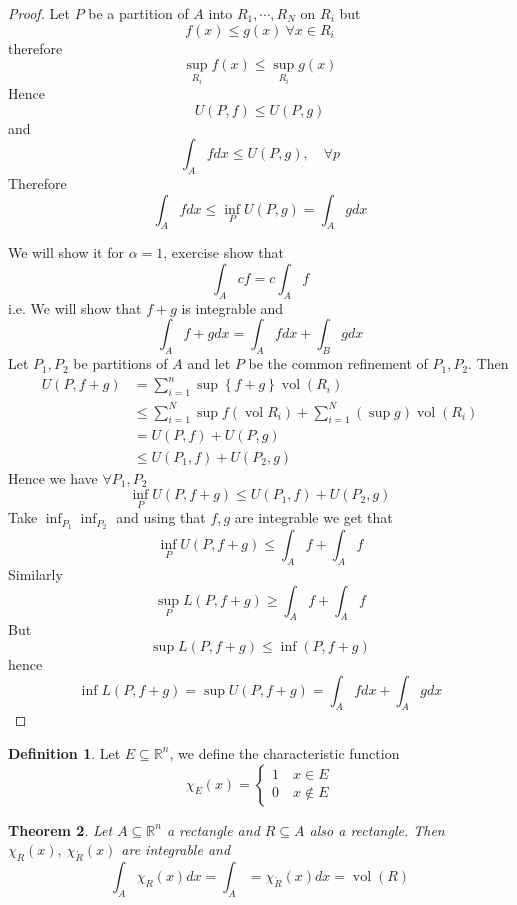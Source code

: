 \documentclass[11pt,a4paper]{article}
\theoremstyle{definition}
\newtheorem{definition}{Definition}[section]
\theoremstyle{plain}
\newtheorem{theorem}[definition]{Theorem}
\theoremstyle{remark}
\newcommand{\R}{\mathbb{R}}
\renewcommand{\set}[1]{\left\{ #1 \right\}}
\newcommand{\vol}{\operatorname{vol}}
\begin{document}
\begin{proof}
    Let $P$ be a partition of $A$ into $R_1, \cdots, R_N$ on $R_i$ but 
    $$f(x) \le g(x) \ \forall x \in R_i$$
    therefore 
    $$\sup_{R_i} f(x) \le \sup_{R_i} g(x)$$
    Hence 
    $$U(P,f) \le U(P,g)$$
    and
    $$\int_A f dx \le U(P,g), \quad \forall p$$
    Therefore 
    $$\int_A f dx \le \inf_P U(P,g) = \int_A g dx$$

    We will show it for $\alpha = 1$, exercise show that 
    $$\int_A cf = c \int_A f$$
    i.e. We will show that $f + g$ is integrable and 
    $$\int_A f + g dx = \int_A f dx + \int_B g dx$$
    Let $P_1, P_2$ be partitions of $A$ and let $P$ be the common refinement of $P_1, P_2$. 
    Then
    \begin{align*}
        U(P,f+g) &= \sum_{i=1}^n \sup \set{f+g} \vol (R_i) \\
        &\le \sum_{i=1}^N \sup f(\vol R_i) + \sum_{i=1}^N (\sup g) \vol (R_i) \\
        &= U(P,f) + U(P,g) \\
        &\le U(P_1, f) + U(P_2, g)
    \end{align*}
    Hence we have $\forall P_1, P_2$
    $$\inf_P U(P,f+g) \le U(P_1, f) + U(P_2, g)$$
    Take $\inf_{P_1} \inf_{P_2}$ and using that $f, g$ are integrable we get that 
    $$\inf_P U(P, f+g) \le \int_A f + \int_A f$$
    Similarly 
    $$\sup_P L(P, f+g) \ge \int_A f + \int_A f$$
    But 
    $$\sup L(P,f+g) \le \inf(P, f+g)$$
    hence 
    $$\inf L(P,f+g) = \sup U(P,f+g) = \int_A f dx + \int_A g dx$$
\end{proof}
 
\begin{definition}
    Let $E \subseteq \R^n$, we define the characteristic function 
    $$\chi_E(x) = \begin{cases}
        1 \quad x \in E \\
        0 \quad x \not\in E
    \end{cases}$$
\end{definition}


\begin{theorem}
    Let $A \subseteq \R^n$ a rectangle and $R \subseteq A$ also a rectangle. 
    Then $\chi_R(x), \ \chi_{\mathring{R}} (x)$ are integrable and 
    $$\int_A \chi_R(x) dx = \int_A = \chi_{\mathring{R}} (x) dx = \vol (R)$$
\end{theorem}
\end{document}
